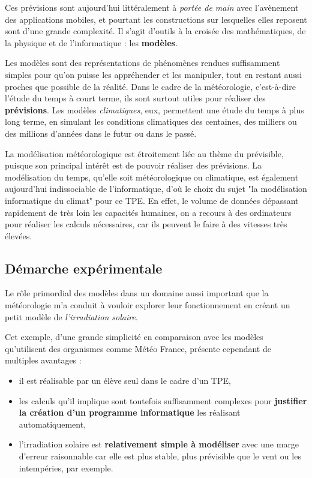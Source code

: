 \documentclass[12pt]{article}
\begin{document}
Ces prévisions sont aujourd'hui littéralement à \emph{portée de main} avec l'avènement des applications mobiles, et pourtant les constructions sur lesquelles elles reposent sont d'une grande complexité.
Il s'agit d'outils à la croisée des mathématiques, de la physique et de l'informatique : les \textbf{modèles}.

Les modèles sont des représentations de phénomènes rendues suffisamment simples pour qu'on puisse les appréhender et les manipuler, tout en restant aussi proches que possible de la réalité.
Dans le cadre de la météorologie, c'est-à-dire l'étude du temps à court terme, ils sont surtout utiles pour réaliser des \textbf{prévisions}.
Les modèles \emph{climatiques}, eux, permettent une étude du temps à plus long terme, en simulant les conditions climatiques des centaines, des milliers ou des millions d'années dans le futur ou dans le passé.

La modélisation météorologique est étroitement liée au thème du prévisible, puisque son principal intérêt est de pouvoir réaliser des prévisions.
La modélisation du temps, qu'elle soit météorologique ou climatique, est également aujourd'hui indissociable de l'informatique, d'où le choix du sujet "la modélisation informatique du climat" pour ce TPE.
En effet, le volume de données dépassant rapidement de très loin les capacités humaines, on a recours à des ordinateurs pour réaliser les calculs nécessaires, car ils peuvent le faire à des vitesses très élevées.


\subsection{Démarche expérimentale}

Le rôle primordial des modèles dans un domaine aussi important que la météorologie m'a conduit à vouloir explorer leur fonctionnement en créant un petit modèle de \emph{l'irradiation solaire}.

Cet exemple, d'une grande simplicité en comparaison avec les modèles qu'utilisent des organismes comme Météo France, présente cependant de multiples avantages :

\begin{itemize}
  \item il est réalisable par un élève seul dans le cadre d'un TPE,
  \item les calculs qu'il implique sont toutefois suffisamment complexes pour \textbf{justifier la création d'un programme informatique} les réalisant automatiquement,
  \item l'irradiation solaire est \textbf{relativement simple à modéliser} avec une marge d'erreur raisonnable car elle est plus stable, plus prévisible que le vent ou les intempéries, par exemple.
\end{itemize}
\end{document}
